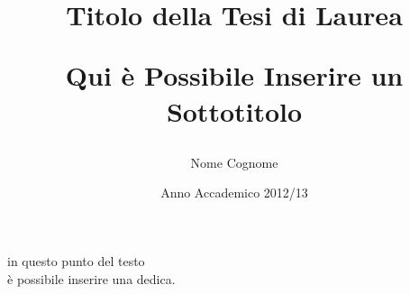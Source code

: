 \documentclass[12pt,oneside,a4paper,PisaPhdThesis]{PhdThesis}
\newlength{\defbaselineskip}
\newcommand{\setlinespacing}[1]%
           {\setlength{\baselineskip}{#1 \defbaselineskip}}
\begin{document}


\title{Titolo della Tesi di Laurea\\
\begin{large}Qui \`e Possibile Inserire un Sottotitolo\end{large} }
\author{Nome Cognome}
\date{Anno Accademico 2012/13}


\pagestyle{serif}
\maketitle

\begin{frontmatter}

\begin{dedication}
    in questo punto del testo\\
    \`e possibile inserire una dedica.
\end{dedication}

\setlinespacing{1.4}


\tableofcontents

 \setcounter{page}{1}

\end{frontmatter}


\setlinespacing{1.4}



%
%


\begin{frontmatter}
\setcounter{page}{52}


\end{frontmatter}
\end{document}
